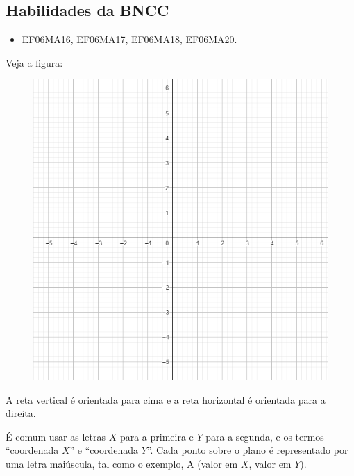 \subsection{Habilidades da BNCC}

\begin{itemize} 
\item  EF06MA16, EF06MA17, EF06MA18, EF06MA20.
\end{itemize}


\noindent Veja a figura:

\begin{figure}
\centering\includegraphics[width=\textwidth]{./imgSAEB_6_MAT/media/image39.png}
\end{figure}

A reta vertical é orientada para cima e a reta horizontal é orientada
para a direita.

É comum usar as letras $X$ para a primeira e $Y$ para a segunda, e os termos
``coordenada $X$'' e ``coordenada $Y$''. Cada ponto sobre o plano é
representado por uma letra maiúscula, tal como o exemplo, A (valor em $X$, valor em $Y$).


